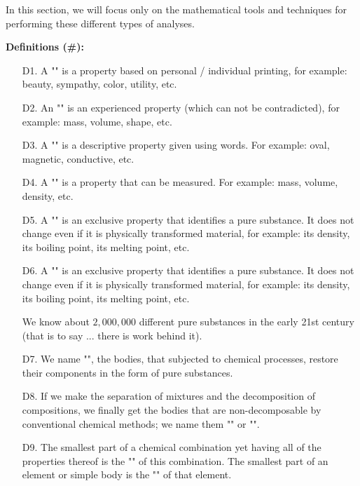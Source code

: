 	In this section, we will focus only on the mathematical tools and techniques for performing these different types of analyses.

	\textbf{Definitions (\#\mydef):}	
	\begin{enumerate}
		\item[D1.] A "" is a property based on personal / individual printing, for example: beauty, sympathy, color, utility, etc.
		
		\item[D2.] An "" is an experienced property (which can not be contradicted), for example: mass, volume, shape, etc.
		
		\item[D3.] A "" is a descriptive property given using words. For example: oval, magnetic, conductive, etc.
		
		\item[D4.] A "" is a property that can be measured. For example: mass, volume, density, etc.
		
		\item[D5.] A "" is an exclusive property that identifies a pure substance. It does not change even if it is physically transformed material, for example: its density, its boiling point, its melting point, etc.
		
		\item[D6.] A "" is an exclusive property that identifies a pure substance. It does not change even if it is physically transformed material, for example: its density, its boiling point, its melting point, etc.
		
		\begin{tcolorbox}[title=Remark,colframe=black,arc=10pt]
	We know about $2,000,000$ different pure substances in the early 21st century (that is to say ... there is work behind it).
		\end{tcolorbox}
		
		\item[D7.] We name "", the bodies, that subjected to chemical processes, restore their components in the form of pure substances.
		
		\item[D8.] If we make the separation of mixtures and the decomposition of compositions, we finally get the bodies that are non-decomposable by conventional chemical methods; we name them "" or "".
		
		\item[D9.] The smallest part of a chemical combination yet having all of the properties thereof is the "" of this combination. The smallest part of an element or simple body is the "" of that element.
	\end{enumerate}
